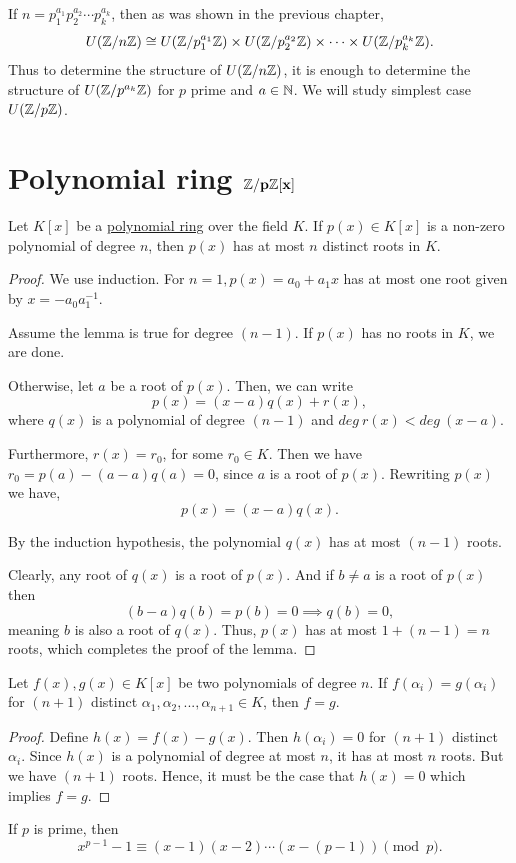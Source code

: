 If $n = p_1^{a_1}p_2^{a_2}\cdots p_k^{a_k}$, then as was shown in the previous chapter, \[U(\mathbb{Z}/n\mathbb{Z}) \cong U(\mathbb{Z}/p_1^{a_1}\mathbb{Z}) \times U(\mathbb{Z}/p_2^{a_2}\mathbb{Z}) \times \cdots \times U(\mathbb{Z}/p_k^{a_k}\mathbb{Z}).\] Thus to determine the structure of $U(\mathbb{Z}/n\mathbb{Z})$, it is enough to determine the structure of $U(\mathbb{Z}/p^{a_k}\mathbb{Z})$ for $p$ prime and $a \in \mathbb{N}$. We will study simplest case $U(\mathbb{Z}/p\mathbb{Z})$.

\section{Polynomial ring $\mathbf{\mathbb{Z}/p\mathbb{Z}[x]}$}
\begin{lemma}
    Let $K[x]$ be a \hyperref[def:polyring]{polynomial ring} over the field $K$. If $p(x) \in K[x]$ is a non-zero polynomial of degree $n$, then $p(x)$ has at most $n$ distinct roots in $K$.
\end{lemma}
\begin{proof}
    We use induction. For $n=1, p(x) = a_0 + a_1x$ has at most one root given by $x = -a_0a_1^{-1}$.

    Assume the lemma is true for degree $(n-1)$. If $p(x)$ has no roots in $K$, we are done. 
    
    Otherwise, let $a$ be a root of $p(x)$. Then, we can write \[p(x) = (x-a)q(x) + r(x),\] where $q(x)$ is a polynomial of degree $(n-1)$ and $deg \ r(x) < deg \ (x-a)$.
    
    Furthermore, $r(x) = r_0$, for some $r_0 \in K$. Then we have $r_0 = p(a) - (a-a)q(a) = 0$, since $a$ is a root of $p(x)$. Rewriting $p(x)$ we have, \[p(x) = (x-a)q(x).\]

    By the induction hypothesis, the polynomial $q(x)$ has at most $(n-1)$ roots.

    Clearly, any root of $q(x)$ is a root of $p(x)$. And if $b \neq a$ is a root of $p(x)$ then \[(b-a)q(b) = p(b) = 0 \implies q(b) = 0,\] meaning $b$ is also a root of $q(x)$. Thus, $p(x)$ has at most $1 + (n-1) = n$ roots, which completes the proof of the lemma.
\end{proof}

\begin{corollary}
    Let $f(x), g(x) \in K[x]$ be two polynomials of degree $n$. If $f(\alpha_i) = g(\alpha_i)$ for $(n+1)$ distinct $\alpha_1, \alpha_2, ..., \alpha_{n+1} \in K$, then $f = g$.
\end{corollary}
\begin{proof}
    Define $h(x) = f(x) - g(x)$. Then $h(\alpha_i) = 0$ for $(n+1)$ distinct $\alpha_i$. Since $h(x)$ is a polynomial of degree at most $n$, it has at most $n$ roots. But we have $(n+1)$ roots. Hence, it must be the case that $h(x) = 0$ which implies $f = g$.
\end{proof}
\begin{theorem}\label{thm:rootsFLT}
    If $p$ is prime, then \[x^{p-1} - 1 \equiv (x - 1)(x - 2) \cdots (x - (p-1)) \pmod{p}.\]
\end{theorem}

